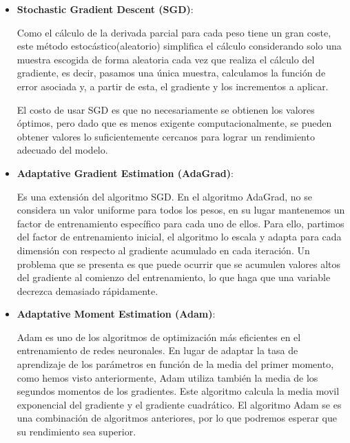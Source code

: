 \documentclass[11pt]{article} %
\begin{document}
\begin{itemize}
	\item \textbf{Stochastic Gradient Descent (SGD)}: 
	
	Como el cálculo de la derivada parcial para cada peso tiene un gran coste, este método estocástico(aleatorio) simplifica el cálculo considerando solo una muestra escogida de forma aleatoria cada vez que realiza el cálculo del gradiente, es decir, pasamos una única muestra, calculamos la función de error asociada y, a partir de esta, el gradiente y los incrementos a aplicar.
	
	El costo de usar SGD es que no necesariamente se obtienen los valores óptimos, pero dado que es menos exigente computacionalmente, se pueden obtener valores lo suficientemente cercanos para lograr un rendimiento adecuado del modelo.
	
	\item \textbf{Adaptative Gradient Estimation (AdaGrad)}: 
	
	Es una extensión del algoritmo SGD. En el algoritmo AdaGrad, no se considera un valor uniforme para todos los pesos, en su lugar mantenemos un factor de entrenamiento específico para cada uno de ellos. Para ello, partimos del factor de entrenamiento inicial, el algoritmo lo escala y adapta para cada dimensión con respecto al gradiente acumulado en cada iteración. Un problema que se presenta es que puede ocurrir que se acumulen valores altos del gradiente al comienzo del entrenamiento, lo que haga que una variable decrezca demasiado rápidamente.
	
	
	\item \textbf{Adaptative Moment Estimation (Adam)}: 
	
	Adam es uno de los algoritmos de optimización más eficientes en el entrenamiento de redes neuronales. En lugar de adaptar la tasa de aprendizaje de los parámetros en función de la media del primer momento, como hemos visto anteriormente, Adam utiliza también la media de los segundos momentos de los gradientes. Este algoritmo calcula la media movil exponencial del gradiente y el gradiente cuadrático. El algoritmo Adam se es una combinación de algoritmos anteriores, por lo que podremos esperar que su rendimiento sea superior.
	

	
	
	
\end{itemize}
\end{document}
